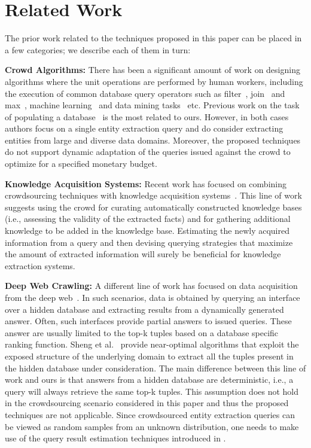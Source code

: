 \section{Related Work}
\label{sec:related}
The prior work related to the techniques proposed in this paper can be placed in a few categories; we describe each of them in turn:

\vspace{5pt}\noindent\textbf{Crowd Algorithms:} There has been a significant amount of work on designing algorithms where the unit operations are performed by human workers, including the execution of common database query operators such as filter~\cite{crowdscreen}, join~\cite{markus-sorts-joins} and max~\cite{so-who-won},  machine learning~\cite{entity-matching, crowdclustering, crowder} and data mining tasks~\cite{amsterdamer:2013, get-another-label} etc. Previous work on the task of populating a database~\cite{park:2014, trushkowsky:2013} is the most related to ours. However, in both cases authors focus on a single entity extraction query and do consider extracting entities from large and diverse data domains. Moreover, the proposed techniques do not support  dynamic adaptation of the queries issued against the crowd to optimize for a specified monetary budget. 

\vspace{5pt}\noindent\textbf{Knowledge Acquisition Systems:} Recent work has focused on combining crowdsourcing techniques with knowledge acquisition systems~\cite{jiang:13, kondredi:2014, west:2014}. This line of work suggests using the crowd for curating automatically constructed knowledge bases (i.e., assessing the validity of the extracted facts) and for gathering additional knowledge to be added in the knowledge base. Estimating the newly acquired information from a query and then  devising querying strategies that maximize the amount of extracted information will surely be beneficial for knowledge extraction systems.

\vspace{5pt}\noindent\textbf{Deep Web Crawling:} A different line of work has focused on data acquisition from the deep web~\cite{Jin:2011,Sheng:2012}. In such scenarios, data is obtained by querying an interface over a hidden database and extracting results from a dynamically generated answer. Often, such interfaces provide partial answers to issued queries. These answer are usually limited to the top-k tuples based on a database specific ranking function. Sheng et al.~\cite{Sheng:2012} provide near-optimal algorithms that exploit the exposed structure of the underlying domain to extract all the tuples present in the hidden database under consideration. The main difference between this line of work and ours is that answers from a hidden database are deterministic, i.e., a query will always retrieve the same top-k tuples. This assumption does not hold in the crowdsourcing scenario considered in this paper and thus the proposed techniques are not applicable. Since crowdsourced entity extraction queries can be viewed as random samples from an unknown  distribution, one needs to make use of the query result estimation techniques introduced in .